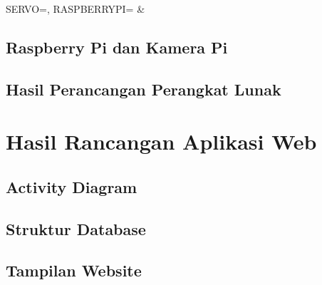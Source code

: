 \begin{atable}
    \caption{Rangkaian pin Servo ke Raspberry Pi}
    \label{table:tableServo}
        {
            SERVO=\SERVO, 
            RASPBERRYPI=\RASPBERRYPI}
        {
            \SERVO & 
            \RASPBERRYPI}
\end{atable}

\subsection{Raspberry Pi dan Kamera Pi}

\subsection{Hasil Perancangan Perangkat Lunak}

\section{Hasil Rancangan Aplikasi Web}

\subsection{Activity Diagram}

\subsection{Struktur Database}

\subsection{Tampilan Website}